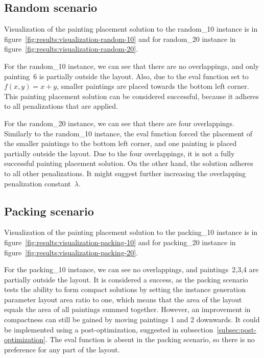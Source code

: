 \newpage

\subsection{Random scenario}\label{subsec:random-scenario}

Visualization of the painting placement solution to the random\_10 instance
is in figure~\ref{fig:results:visualization-random-10}
and for random\_20 instance in figure~\ref{fig:results:visualization-random-20}.

For the random\_10 instance, we can see that there are no overlappings, and only painting~6 is partially outside the layout.
Also, due to the eval function set to $f(x,y) = x+y$, smaller paintings
are placed towards the bottom left corner.
This painting placement solution can be considered successful,
because it adheres to all penalizations that are applied.

For the random\_20 instance, we can see that there are four overlappings.
Similarly to the random\_10 instance, the eval function forced the placement of the
smaller paintings to the bottom left corner, and one painting is placed partially outside the layout.
Due to the four overlappings, it is not a fully successful painting placement solution.
On the other hand, the solution adheres to all other penalizations.
It might suggest further increasing the overlapping penalization constant~$\lambda$.

\subsection{Packing scenario}\label{subsec:packing-scenario}
Visualization of the painting placement solution to the packing\_10 instance
is in figure~\ref{fig:results:visualization-packing-10}
and for packing\_20 instance in figure~\ref{fig:results:visualization-packing-20}.

For the packing\_10 instance, we can see no overlappings, and paintings~2,3,4 are partially outside the layout.
It is considered a success, as the packing scenario tests the ability to form compact solutions by setting the instance generation parameter
layout area ratio to one, which means that the area of the layout equals the area of all paintings summed together.
However, an improvement in compactness can still be gained by moving paintings 1 and 2 downwards.
It could be implemented using a post-optimization, suggested in subsection~\ref{subsec:post-optimization}.
The eval function is absent in the packing scenario, so there is no preference for any part of the layout.

